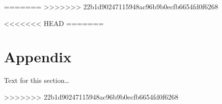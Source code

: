 \documentclass{bmcart}
\begin{document}
=======
>>>>>>> 22b1d90247115948ac96b9b0ecfb6654fd0f6268
%


<<<<<<< HEAD
=======
\section*{Appendix}
Text for this section\ldots

>>>>>>> 22b1d90247115948ac96b9b0ecfb6654fd0f6268
\end{document}
